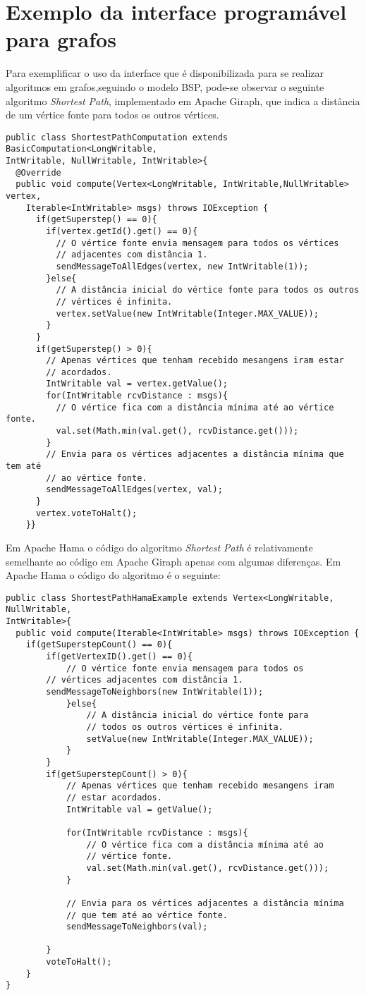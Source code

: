 \section{Exemplo da interface programável para grafos}

Para exemplificar o uso da interface que é disponibilizada para se 
realizar algoritmos em grafos,seguindo o modelo BSP, pode-se observar o 
seguinte algoritmo \textit{Shortest Path}, implementado em Apache Giraph, que 
indica a distância de um vértice fonte para todos os outros vértices.
\begin{verbatim}
public class ShortestPathComputation extends BasicComputation<LongWritable, 
IntWritable, NullWritable, IntWritable>{
  @Override
  public void compute(Vertex<LongWritable, IntWritable,NullWritable> vertex, 
	Iterable<IntWritable> msgs) throws IOException {
	  if(getSuperstep() == 0){
	    if(vertex.getId().get() == 0){
	      // O vértice fonte envia mensagem para todos os vértices 
	      // adjacentes com distância 1.
	      sendMessageToAllEdges(vertex, new IntWritable(1));
	    }else{
	      // A distância inicial do vértice fonte para todos os outros 
	      // vértices é infinita.
	      vertex.setValue(new IntWritable(Integer.MAX_VALUE));			
	    }
	  }
	  if(getSuperstep() > 0){
	    // Apenas vértices que tenham recebido mesangens iram estar 
	    // acordados.
	    IntWritable val = vertex.getValue();		
	    for(IntWritable rcvDistance : msgs){
	      // O vértice fica com a distância mínima até ao vértice fonte.
	      val.set(Math.min(val.get(), rcvDistance.get()));
	    }
	    // Envia para os vértices adjacentes a distância mínima que tem até 
	    // ao vértice fonte.
	    sendMessageToAllEdges(vertex, val);		
	  } 
	  vertex.voteToHalt();
	}}
\end{verbatim}

Em Apache Hama o código do algoritmo \textit{Shortest Path} é relativamente 
semelhante ao código em Apache Giraph apenas com algumas diferenças. Em Apache 
Hama o código do algoritmo é o seguinte:

\begin{verbatim}
public class ShortestPathHamaExample extends Vertex<LongWritable, NullWritable, 
IntWritable>{
  public void compute(Iterable<IntWritable> msgs) throws IOException {
	if(getSuperstepCount() == 0){
		if(getVertexID().get() == 0){
			// O vértice fonte envia mensagem para todos os 
		// vértices adjacentes com distância 1.
		sendMessageToNeighbors(new IntWritable(1));
			}else{
				// A distância inicial do vértice fonte para 
				// todos os outros vértices é infinita.
				setValue(new IntWritable(Integer.MAX_VALUE));
			}
		}
		if(getSuperstepCount() > 0){
			// Apenas vértices que tenham recebido mesangens iram 
			// estar acordados.
			IntWritable val = getValue();
			
			for(IntWritable rcvDistance : msgs){
				// O vértice fica com a distância mínima até ao 
				// vértice fonte.
				val.set(Math.min(val.get(), rcvDistance.get()));
			}
			
			// Envia para os vértices adjacentes a distância mínima 
			// que tem até ao vértice fonte.
			sendMessageToNeighbors(val);
			
		}
		voteToHalt();	
	}
}
\end{verbatim}
